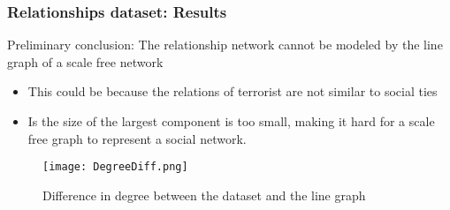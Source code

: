 
\begin{frame}
\frametitle{Relationships dataset: Results}


Preliminary conclusion: The relationship network cannot be modeled by the line graph of a scale free network
\begin{itemize}
\item This could be because the relations of terrorist are not similar to social ties
\item Is the size of the largest component is too small, making it hard for a scale free graph to represent a social network.
\end{itemize}


\begin{figure}[H]
\begin{center}
\texttt{[image: DegreeDiff.png]}
\caption{Difference in degree between the dataset and the line graph}
\label{fig:degdiff}
\end{center}
\end{figure}
\end{frame}

